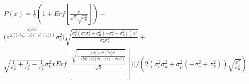 \documentclass[letterpaper,10pt]{article}
\begin{document}
\begin{multline*}
P(x) = \frac{1}{2} \left(1+ {Erf}\left[\frac{x}{\sqrt{2} \sqrt{\sigma_{\mu}^2}}\right]\right)-\\
\Biggl(e^{\frac{\sigma_{\mu}^2  {\sigma_{c}^2} x^2}{2  {\sigma_{k}^2} ( {\sigma_{c}^2}  {\sigma_{k}^2}+\sigma_{\mu}^2 (- {\sigma_{c}^2}+ {\sigma_{k}^2}))}}  {\sigma_{c}^2} \Biggl(\sqrt{\frac{ {\sigma_{k}^2} ( {\sigma_{c}^2}  {\sigma_{k}^2}+\sigma_{\mu}^2 (- {\sigma_{c}^2}+ {\sigma_{k}^2})) x^2}{\sigma_{\mu}^2  {\sigma_{c}^2}}}+\\
\sqrt{\frac{1}{\sigma_{\mu}^2}+\frac{1}{ {\sigma_{c}^2}}-\frac{1}{ {\sigma_{k}^2}}}  {\sigma_{k}^2} x  {Erf}\left[\frac{\sqrt{-\frac{(\sigma_{\mu}^2+ {\sigma_{c}^2})^2  {\sigma_{k}^2} x^2}{\sigma_{\mu}^2  {\sigma_{c}^2} (\sigma_{\mu}^2 ( {\sigma_{c}^2}- {\sigma_{k}^2})- {\sigma_{c}^2}  {\sigma_{k}^2})}}}{\sqrt{2}}\right]\Biggr)\Biggr)/\left(2 ( {\sigma_{c}^2}  {\sigma_{k}^2}+\sigma_{\mu}^2 (- {\sigma_{c}^2}+ {\sigma_{k}^2})) \sqrt{\frac{x^2}{\sigma_{\mu}^2}}\right)
\end{multline*}
\end{document}
